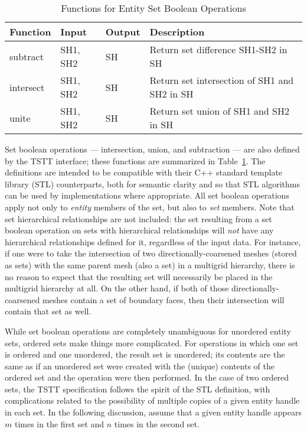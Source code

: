 \begin{table}[tbp]
\caption{Functions for Entity Set Boolean Operations}\label{table:SetBool}
{\small
\begin{tabular}{|p{1.25in}|p{0.75in}|p{0.75in}|p{223pt}|}
\hline 
Function&
Input&
Output&
Description\tabularnewline
\hline
\hline 
subtract&
SH1, SH2&
SH&
Return set difference SH1-SH2 in SH\tabularnewline
\hline 
intersect&
SH1, SH2&
SH&
Return set intersection of SH1 and SH2 in SH\tabularnewline
\hline 
unite&
SH1, SH2&
SH&
Return set union of SH1 and SH2 in SH\tabularnewline
\hline
\end{tabular}
}
\end{table}
Set boolean operations --- intersection, union, and subtraction --- are
also defined by the TSTT interface; these functions are summarized in
Table~\ref{table:SetBool}. The definitions are intended to be compatible
with their C++ standard template library (STL) counterparts, both for
semantic clarity and so that STL algorithms can be used by
implementations where appropriate. All set boolean operations apply not
only to \emph{entity} members of the set, but also to \emph{set}
members. Note that set hierarchical relationships are not included: the
set resulting from a set boolean operation on sets with hierarchical
relationships will \emph{not} have any hierarchical relationships
defined for it, regardless of the input data. For instance, if one were
to take the intersection of two directionally-coarsened meshes (stored
as sets) with the same parent mesh (also a set) in a multigrid
hierarchy, there is no reason to expect that the resulting set will
necessarily be placed in the multigrid hierarchy at all. On the other
hand, if both of those directionally-coarsened meshes contain a set of
boundary faces, then their intersection will contain that set as well.

While set boolean operations are completely unambiguous for unordered
entity sets, ordered sets make things more complicated. For operations
in which one set is ordered and one unordered, the result set is unordered;
its contents are the same as if an unordered set were created with
the (unique) contents of the ordered set and the operation were
then performed. In the case of two ordered sets, the TSTT specification
follows the spirit of the STL definition, with complications related
to the possibility of multiple copies of a given entity handle in
each set. In the following discussion, assume that a given entity
handle appears $m$ times in the first set and $n$ times in the second
set. 

